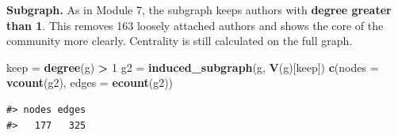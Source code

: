 \documentclass[
  10pt,
]{article}
\newenvironment{Shaded}{\begin{snugshade}}{\end{snugshade}}
\newcommand{\AttributeTok}[1]{\textcolor[rgb]{0.13,0.29,0.53}{#1}}
\newcommand{\DecValTok}[1]{\textcolor[rgb]{0.00,0.00,0.81}{#1}}
\newcommand{\FunctionTok}[1]{\textcolor[rgb]{0.13,0.29,0.53}{\textbf{#1}}}
\newcommand{\NormalTok}[1]{#1}
\newcommand{\OtherTok}[1]{\textcolor[rgb]{0.56,0.35,0.01}{#1}}
\newcommand{\SpecialCharTok}[1]{\textcolor[rgb]{0.81,0.36,0.00}{\textbf{#1}}}
\begin{document}
\textbf{Subgraph.} As in Module 7, the subgraph keeps authors with
\textbf{degree greater than 1}. This removes 163 loosely attached
authors and shows the core of the community more clearly. Centrality is
still calculated on the full graph.

\begin{Shaded}
\begin{Highlighting}[]
\NormalTok{keep }\OtherTok{=} \FunctionTok{degree}\NormalTok{(g) }\SpecialCharTok{\textgreater{}} \DecValTok{1}
\NormalTok{g2 }\OtherTok{=} \FunctionTok{induced\_subgraph}\NormalTok{(g, }\FunctionTok{V}\NormalTok{(g)[keep])}
\FunctionTok{c}\NormalTok{(}\AttributeTok{nodes =} \FunctionTok{vcount}\NormalTok{(g2), }\AttributeTok{edges =} \FunctionTok{ecount}\NormalTok{(g2))}
\end{Highlighting}
\end{Shaded}

\begin{verbatim}
#> nodes edges 
#>   177   325
\end{verbatim}
\end{document}

